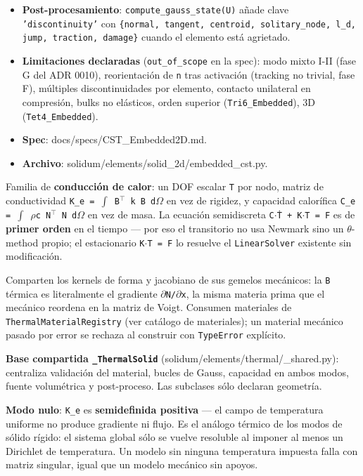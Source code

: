 \documentclass[11pt,letterpaper,oneside]{report}
\begin{document}
\begin{itemize}
  \item \textbf{Post-procesamiento}: \texttt{compute\_gauss\_state(U)} añade clave \texttt{'discontinuity'} con \texttt{\{normal, tangent, centroid, solitary\_node, l\_d, jump, traction, damage\}} cuando el elemento está agrietado.
  \item \textbf{Limitaciones declaradas} (\texttt{out\_of\_scope} en la spec): modo mixto I-II (fase G del ADR 0010), reorientación de \texttt{n} tras activación (tracking no trivial, fase F), múltiples discontinuidades por elemento, contacto unilateral en compresión, bulks no elásticos, orden superior (\texttt{Tri6\_Embedded}), 3D (\texttt{Tet4\_Embedded}).
  \item \textbf{Spec}: docs/specs/CST\_Embedded2D.md.
  \item \textbf{Archivo}: solidum/elements/solid\_2d/embedded\_cst.py.
\end{itemize}


Familia de \textbf{conducción de calor}: un DOF escalar \texttt{T} por nodo, matriz de conductividad \texttt{K\_e = \ensuremath{\int} B\ensuremath{^{\top}} k B d\ensuremath{\Omega}} en vez de rigidez, y capacidad calorífica \texttt{C\_e = \ensuremath{\int} \ensuremath{\rho}c N\ensuremath{^{\top}} N d\ensuremath{\Omega}} en vez de masa. La ecuación semidiscreta \texttt{C\ensuremath{\cdot}Ṫ + K\ensuremath{\cdot}T = F} es de \textbf{primer orden} en el tiempo --- por eso el transitorio no usa Newmark sino un \ensuremath{\theta}-method propio; el estacionario \texttt{K\ensuremath{\cdot}T = F} lo resuelve el \texttt{LinearSolver} existente sin modificación.

Comparten los kernels de forma y jacobiano de sus gemelos mecánicos: la \texttt{B} térmica es literalmente el gradiente \texttt{\ensuremath{\partial}N/\ensuremath{\partial}x}, la misma materia prima que el mecánico reordena en la matriz de Voigt. Consumen materiales de \texttt{ThermalMaterialRegistry} (ver catálogo de materiales); un material mecánico pasado por error se rechaza al construir con \texttt{TypeError} explícito.

\textbf{Base compartida \texttt{\_ThermalSolid}} (solidum/elements/thermal/\_shared.py): centraliza validación del material, bucles de Gauss, capacidad en ambos modos, fuente volumétrica y post-proceso. Las subclases sólo declaran geometría.

\textbf{Modo nulo}: \texttt{K\_e} es \textbf{semidefinida positiva} --- el campo de temperatura uniforme no produce gradiente ni flujo. Es el análogo térmico de los modos de sólido rígido: el sistema global sólo se vuelve resoluble al imponer al menos un Dirichlet de temperatura. Un modelo sin ninguna temperatura impuesta falla con matriz singular, igual que un modelo mecánico sin apoyos.
\end{document}

